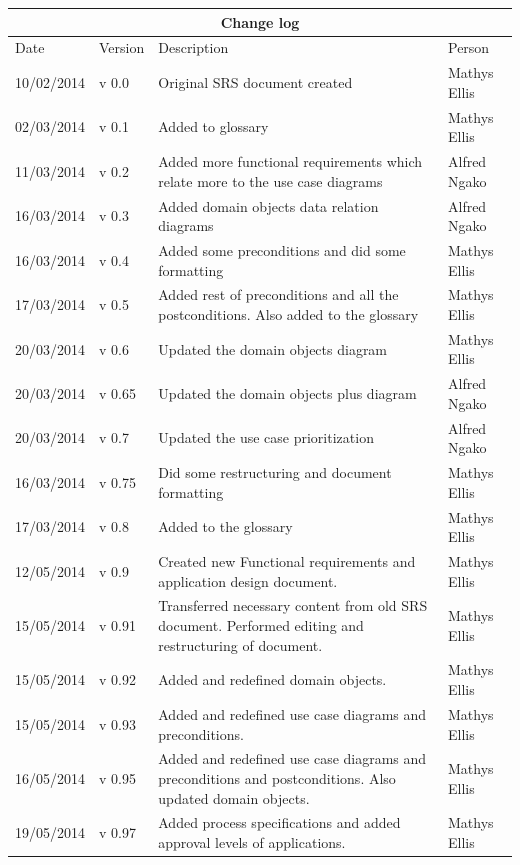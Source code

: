 \documentclass[12pt]{article}
\begin{document}
\begin{center}
\begin{tabular}{|l|p{1.4cm}|p{8cm}|p{2.8cm}|}
\hline
\multicolumn{4}{|c|}{\bf Change log} \\
\hline
 Date & Version & Description &  Person \\
\hline
10/02/2014 & v 0.0 & Original SRS document created & Mathys Ellis \\
\hline
02/03/2014 & v 0.1 & Added to glossary & Mathys Ellis \\
\hline
11/03/2014 & v 0.2 & Added more functional requirements which relate more to the use case diagrams & Alfred Ngako \\
\hline
16/03/2014 & v 0.3 & Added domain objects data relation diagrams & Alfred Ngako \\
\hline
16/03/2014 & v 0.4 & Added some preconditions and did some formatting & Mathys Ellis \\
\hline
17/03/2014 & v 0.5 & Added rest of preconditions and all the postconditions. Also added to the glossary & Mathys Ellis \\
\hline
20/03/2014 & v 0.6 & Updated the domain objects diagram  & Mathys Ellis \\
\hline
20/03/2014 & v 0.65 & Updated the domain objects plus diagram  & Alfred Ngako \\
\hline
20/03/2014 & v 0.7 & Updated the use case prioritization  & Alfred Ngako \\
\hline
16/03/2014 & v 0.75 & Did some restructuring and document formatting & Mathys Ellis \\
\hline
17/03/2014 & v 0.8 & Added to the glossary & Mathys Ellis \\
\hline
12/05/2014 & v 0.9 & Created new Functional requirements and application design document. & Mathys Ellis \\
\hline
15/05/2014 & v 0.91 & Transferred necessary content from old SRS document. Performed editing and restructuring of document. & Mathys Ellis \\
\hline
15/05/2014 & v 0.92 & Added and redefined domain objects. & Mathys Ellis \\
\hline
15/05/2014 & v 0.93 & Added and redefined use case diagrams and preconditions. & Mathys Ellis \\
\hline
16/05/2014 & v 0.95 & Added and redefined use case diagrams and preconditions and postconditions. Also updated domain objects. & Mathys Ellis \\
\hline
19/05/2014 & v 0.97 & Added process specifications and added approval levels of applications. & Mathys Ellis \\

\end{tabular}
\end{center}
\end{document}
